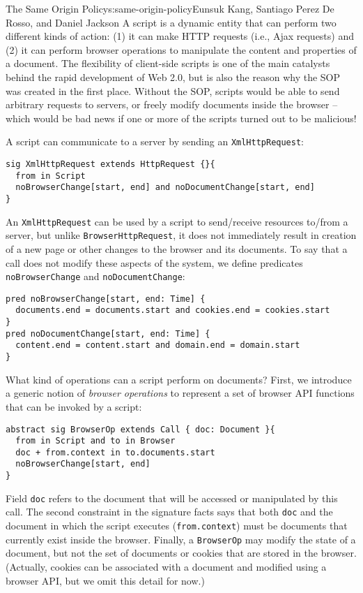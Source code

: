 \begin{aosachapter}{The Same Origin Policy}{s:same-origin-policy}{Eunsuk Kang, Santiago Perez De Rosso, and Daniel Jackson}
A script is a dynamic entity that can perform two different kinds of
action: (1) it can make HTTP requests (i.e., Ajax requests) and (2) it
can perform browser operations to manipulate the content and properties
of a document. The flexibility of client-side scripts is one of the main
catalysts behind the rapid development of Web 2.0, but is also the
reason why the SOP was created in the first place. Without the SOP,
scripts would be able to send arbitrary requests to servers, or freely
modify documents inside the browser -- which would be bad news if one or
more of the scripts turned out to be malicious!

A script can communicate to a server by sending an
\texttt{XmlHttpRequest}:

\begin{verbatim}
sig XmlHttpRequest extends HttpRequest {}{
  from in Script
  noBrowserChange[start, end] and noDocumentChange[start, end]
}
\end{verbatim}

An \texttt{XmlHttpRequest} can be used by a script to send/receive
resources to/from a server, but unlike \texttt{BrowserHttpRequest}, it
does not immediately result in creation of a new page or other changes
to the browser and its documents. To say that a call does not modify
these aspects of the system, we define predicates
\texttt{noBrowserChange} and \texttt{noDocumentChange}:

\begin{verbatim}
pred noBrowserChange[start, end: Time] {
  documents.end = documents.start and cookies.end = cookies.start  
}
pred noDocumentChange[start, end: Time] {
  content.end = content.start and domain.end = domain.start  
}
\end{verbatim}

What kind of operations can a script perform on documents? First, we
introduce a generic notion of \emph{browser operations} to represent a
set of browser API functions that can be invoked by a script:

\begin{verbatim}
abstract sig BrowserOp extends Call { doc: Document }{
  from in Script and to in Browser
  doc + from.context in to.documents.start
  noBrowserChange[start, end]
}
\end{verbatim}

Field \texttt{doc} refers to the document that will be accessed or
manipulated by this call. The second constraint in the signature facts
says that both \texttt{doc} and the document in which the script
executes (\texttt{from.context}) must be documents that currently exist
inside the browser. Finally, a \texttt{BrowserOp} may modify the state
of a document, but not the set of documents or cookies that are stored
in the browser. (Actually, cookies can be associated with a document and
modified using a browser API, but we omit this detail for now.)


\end{aosachapter}
